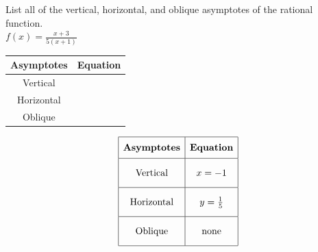 \documentclass[11pt]{exam}
\begin{document}
\begin{questions}

\label{exact-endocd}

\newpage

\headerbox{\oce}
\label{exact-startoce}

\question[5]
List all of the vertical, horizontal, and oblique asymptotes of the rational function.\\

\(\displaystyle{ f(x) = \displaystyle{\frac{x + 3}{5(x + 1)}} }\)

\renewcommand{\arraystretch}{3}
	\begin{tabular}{|c|c|}
		\hline
		\textbf{Asymptotes}  & \textbf{Equation} \\ \hline
		Vertical   & \hspace{50mm}         \\ \hline
		Horizontal &          \\ \hline
		Oblique    &          \\ \hline
	\end{tabular}
\begin{solution}
\[\begin{array}{|c|c|} \hline \rule[-0.8em]{0pt}{2.2em} \textbf{Asymptotes} & \textbf{Equation} \\ \hline \rule[-1.2em]{0pt}{3em} \text{Vertical} & x = -1 \\ \hline \rule[-1.2em]{0pt}{3em} \text{Horizontal} & y = \frac{1}{5} \\ \hline \rule[-1.2em]{0pt}{3em} \text{Oblique} & \text{none} \\ \hline \end{array}\]
\end{solution}
\label{exact-endoce}


\end{questions}
\end{document}
